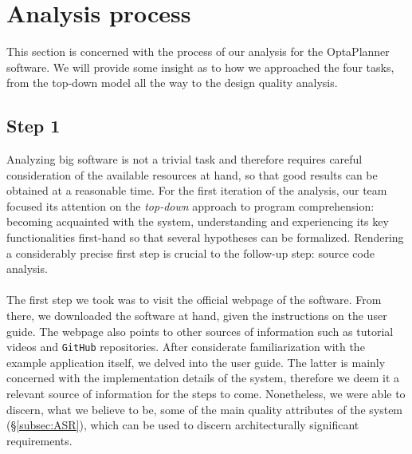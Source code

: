 \section{Analysis process}
This section is concerned with the process of our analysis for the OptaPlanner software. We will provide some insight as to how we approached the four tasks, from the top-down model all the way to the design quality analysis.
\subsection{Step 1}
Analyzing big software is not a trivial task and therefore requires careful consideration of the available resources at hand, so that good results can be obtained at a reasonable time.  For the first iteration of the analysis, our team focused its attention on the \textit{top-down} approach to program comprehension: becoming acquainted with the system, understanding and experiencing its key functionalities first-hand so that several hypotheses can be formalized. Rendering a considerably precise first step is crucial to the follow-up step: source code analysis.
\\\\
The first step we took was to visit the official webpage of the software. From there, we downloaded the software at hand, given the instructions on the user guide. The webpage also points to other sources of information such as tutorial videos and \verb!GitHub! repositories. After considerate familiarization with the example application itself, we delved into the user guide. The latter is mainly concerned with the implementation details of the system, therefore we deem it a relevant source of information for the steps to come. Nonetheless, we were able to discern, what we believe to be, some of the main quality attributes of the system (\S\ref{subsec:ASR}), which can be used to discern architecturally significant requirements.
